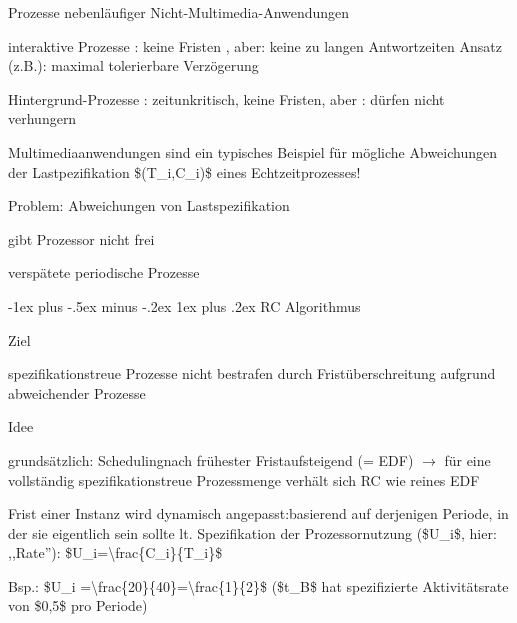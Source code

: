 \documentclass[a4paper]{article}
\makeatletter
\renewcommand{\subsubsection}{\@startsection{subsubsection}{3}{0mm}%
 {-1ex plus -.5ex minus -.2ex}%
 {1ex plus .2ex}%
 {\normalfont\small\bfseries}}
\makeatother
\begin{document}
\begin{multicols}{3}
    \begin{enumerate*}
        \setcounter{enumi}{1}
        \item
        Prozesse nebenläufiger Nicht-Multimedia-Anwendungen
        \begin{itemize*}
            \item interaktive Prozesse : keine Fristen , aber: keine zu langen Antwortzeiten Ansatz (z.B.): maximal tolerierbare Verzögerung
            \item Hintergrund-Prozesse : zeitunkritisch, keine Fristen, aber : dürfen nicht verhungern
        \end{itemize*}
    \end{enumerate*}

    Multimediaanwendungen sind ein typisches Beispiel für mögliche
    Abweichungen der Lastpezifikation \$(T\_i,C\_i)\$ eines
    Echtzeitprozesses!

    Problem: Abweichungen von Lastspezifikation

    \begin{itemize*}
        \item
        gibt Prozessor nicht frei
        \item
        verspätete periodische Prozesse
    \end{itemize*}


    \subsubsection{RC Algorithmus}

    \begin{itemize*}
        \item
        Ziel
        \begin{itemize*}
            \item spezifikationstreue Prozesse nicht bestrafen durch Fristüberschreitung aufgrund abweichender Prozesse
        \end{itemize*}
        \item
        Idee
        \begin{itemize*}
            \item grundsätzlich: Schedulingnach frühester Fristaufsteigend (= EDF) $\rightarrow$  für eine vollständig spezifikationstreue Prozessmenge verhält sich RC wie reines EDF
            \item Frist einer Instanz wird dynamisch angepasst:basierend auf derjenigen Periode, in der sie eigentlich sein sollte lt. Spezifikation der Prozessornutzung (\$U\_i\$, hier: ,,Rate''): \$U\_i=\textbackslash frac\{C\_i\}\{T\_i\}\$
            \item Bsp.: \$U\_i =\textbackslash frac\{20\}\{40\}=\textbackslash frac\{1\}\{2\}\$ (\$t\_B\$ hat spezifizierte Aktivitätsrate von \$0,5\$ pro Periode)
        \end{itemize*}
    \end{itemize*}



\end{multicols}
\end{document}
